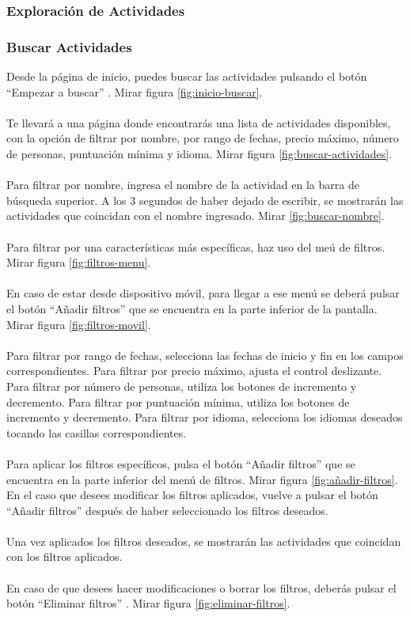 \subsubsection{Exploración de Actividades}
\hrulefill
\subsubsection{Buscar Actividades}

Desde la página de inicio, puedes buscar las actividades pulsando el botón “Empezar a buscar” . Mirar figura \ref{fig:inicio-buscar}.
\\ \\[1ex]
Te llevará a una página donde encontrarás una lista de actividades disponibles, con la opción de filtrar por nombre, por rango de fechas, precio máximo, número de personas, puntuación mínima y idioma.
Mirar figura \ref{fig:buscar-actividades}.
\\ \\[1ex]
Para filtrar por nombre, ingresa el nombre de la actividad en la barra de búsqueda superior. A los 3 segundos de haber dejado de escribir, se mostrarán las actividades que coincidan con el nombre ingresado. Mirar \ref{fig:buscar-nombre}.
\\ \\[1ex]
Para filtrar por una características más específicas, haz uso del meú de filtros. Mirar figura \ref{fig:filtros-menu}.
\\ \\[1ex]
En caso de estar desde dispositivo móvil, para llegar a ese menú se deberá pulsar el botón “Añadir filtros” que se encuentra en la parte inferior de la pantalla. Mirar figura \ref{fig:filtros-movil}.
\\ \\[1ex]
Para filtrar por rango de fechas, selecciona las fechas de inicio y fin en los campos correspondientes.
Para filtrar por precio máximo, ajusta el control deslizante.
Para filtrar por número de personas, utiliza los botones de incremento y decremento.
Para filtrar por puntuación mínima, utiliza los botones de incremento y decremento.
Para filtrar por idioma, selecciona los idiomas deseados tocando las casillas correspondientes.
\\ \\[1ex]
Para aplicar los filtros específicos, pulsa el botón “Añadir filtros” que se encuentra en la parte inferior del menú de filtros. Mirar figura \ref{fig:añadir-filtros}.
En el caso que desees modificar los filtros aplicados, vuelve a pulsar el botón “Añadir filtros” después de haber seleccionado los filtros deseados.
\\ \\[1ex]
Una vez aplicados los filtros deseados, se mostrarán las actividades que coincidan con los filtros aplicados.
\\ \\[1ex]
En caso de que desees hacer modificaciones o borrar los filtros, deberás pulsar el botón “Eliminar filtros” . Mirar figura \ref{fig:eliminar-filtros}.

